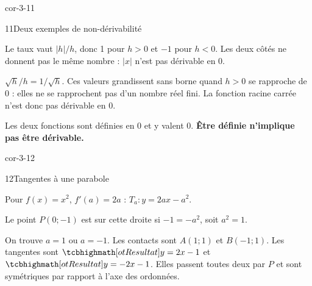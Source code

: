 \begin{blocLivre}{cor-3-11}
\begin{corrige}{11}{Deux exemples de non-dérivabilité}
\begin{questions}
\item Le taux vaut $|h|/h$, donc 1 pour $h>0$ et $-1$ pour $h<0$.
Les deux côtés ne donnent pas le même nombre : $|x|$ n'est pas dérivable en 0.
\item $\sqrt h/h=1/\sqrt h$. Ces valeurs grandissent sans borne quand $h>0$
se rapproche de 0 : elles ne se rapprochent pas d'un nombre réel fini.
La fonction racine carrée n'est donc pas dérivable en 0.
\item Les deux fonctions sont définies en 0 et y valent 0.
\textbf{Être définie n'implique pas être dérivable.}
\end{questions}
\label{figlivre-r03-11-nonderivable-cor}

\end{corrige}
\end{blocLivre}
\begin{blocLivre}{cor-3-12}
\begin{corrige}{12}{Tangentes à une parabole}
\begin{questions}
\item Pour $f(x)=x^2$, $f'(a)=2a$ : $T_a:y=2ax-a^2$.
\item Le point $P(0;-1)$ est sur cette droite si $-1=-a^2$, soit $a^2=1$.
\item On trouve $a=1$ ou $a=-1$. Les contacts sont $A(1;1)$ et $B(-1;1)$.
Les tangentes sont $\res{y=2x-1}$ et $\res{y=-2x-1}$.
Elles passent toutes deux par $P$ et sont symétriques par rapport à l'axe des ordonnées.
\end{questions}
\begin{center}\end{center}
\end{corrige}
\end{blocLivre}
